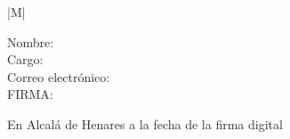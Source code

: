\documentclass[10pt,a4paper,oneside]{article}
\begin{document}
\ifthenelse{\equal{\myCoTutorFullName}{}}
{
}
{

\noindent
\begin{tabular}{|M{\textwidth}|}
\hline
\textbf{\small \MakeUppercase{\wordCoTutorOrCoTutora}}\vspace*{-5.5pt}\\
\hline
\end{tabular}


\begin{description}
  \item[Nombre:] \myCoTutorFullName
  \item[Cargo:] \myCoTutorPosition
  \item[Correo electrónico:] \myCoTutorEmail
  \item[FIRMA:]
\end{description}
}

\vspace{2.25cm}


\noindent En Alcalá de Henares a la fecha de la firma digital %

\end{document}
